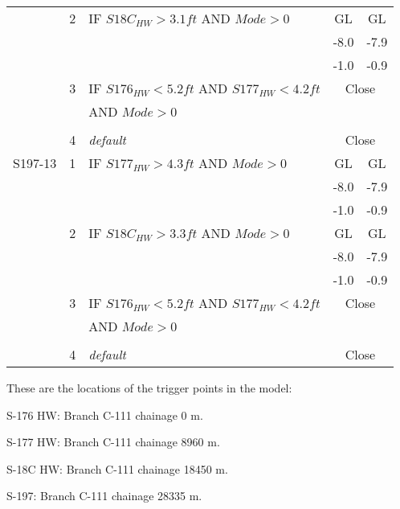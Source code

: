 \begin{table}[!h]
\begin{tabular}{|l|c|l|c|c|}
\hline
              &  2  & IF $S18C_{HW}>3.1 ft$ AND $Mode>0$     & GL    & GL    \\
              &     &                                        & -8.0  & -7.9  \\
              &     &                                        & -1.0  & -0.9  \\
\hline
              &  3  & IF $S176_{HW}<5.2 ft$ AND $S177_{HW}<4.2 ft$     & \multicolumn{2}{|c|}{Close}  \\
              &     & AND $Mode>0$                           & \multicolumn{2}{|c|}{}    \\
              &     &                                        & \multicolumn{2}{|c|}{}     \\
\hline
              &  4  & \it{default}                           & \multicolumn{2}{|c|}{Close}           \\
\hline
\hline
S197-13       &  1  & IF $S177_{HW}>4.3 ft$ AND $Mode>0$     & GL    & GL    \\
              &     &                                        & -8.0  & -7.9  \\
              &     &                                        & -1.0  & -0.9  \\
\hline
              &  2  & IF $S18C_{HW}>3.3 ft$ AND $Mode>0$     & GL    & GL    \\
              &     &                                        & -8.0  & -7.9  \\
              &     &                                        & -1.0  & -0.9  \\
\hline
              &  3  & IF $S176_{HW}<5.2 ft$ AND $S177_{HW}<4.2 ft$     & \multicolumn{2}{|c|}{Close}  \\
              &     & AND $Mode>0$                           & \multicolumn{2}{|c|}{}    \\
              &     &                                        & \multicolumn{2}{|c|}{}     \\
\hline
              &  4  & \it{default}                           & \multicolumn{2}{|c|}{Close}           \\
\hline
\hline
\end{tabular}
\end{table}
\normalsize
These are the locations of the trigger points in the model:
\begin{packed_items}
\item S-176 HW: Branch C-111 chainage 0 m.
\item S-177 HW: Branch C-111 chainage 8960 m.
\item S-18C HW: Branch C-111 chainage 18450 m.
\item S-197: Branch C-111 chainage 28335 m.
\end{packed_items}

